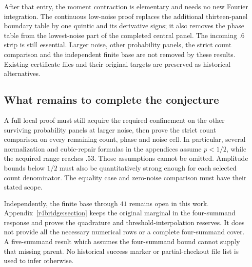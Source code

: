 After that entry, the moment contraction is elementary and needs no new
Fourier integration. The continuous low-noise proof replaces the additional
thirteen-panel boundary table by one quintic and its derivative signs; it
also removes the phase table from the lowest-noise part of the completed
central panel. The incoming $.6$ strip is still essential. Larger noise,
other probability panels, the strict count comparison and the independent
finite base are not removed by these results. Existing certificate files
and their original targets are preserved as historical alternatives.

\subsection{What remains to complete the conjecture}

A full local proof must still acquire the required confinement on the
other surviving probability panels at larger noise, then prove the strict
count comparison on every remaining count, phase and noise cell. In
particular, several normalization and cubic-repair formulas in the
appendices assume $p<1/2$, while the acquired range reaches $.53$.
Those assumptions cannot be omitted. Amplitude bounds below $1/2$ must
also be quantitatively strong enough for each selected count denominator.
The equality case and zero-noise comparison must have their stated scope.

Independently, the finite base through $41$ remains open in this work.
Appendix~\ref{r4bridge:section} keeps the original marginal in the
four-summand response and proves the quadrature and threshold-interpolation
reserves. It does not provide all the necessary numerical rows or a complete
four-summand cover. A five-summand result which assumes the four-summand
bound cannot supply that missing parent. No historical success marker or
partial-checkout file list is used to infer otherwise.
